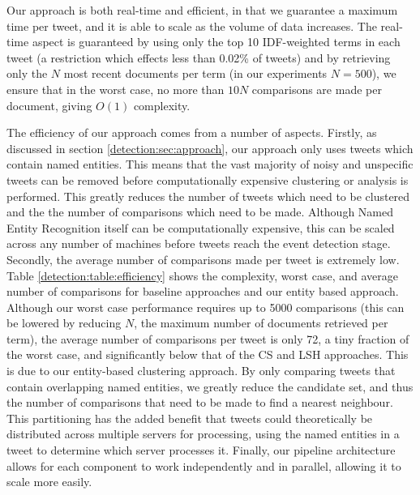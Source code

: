 Our approach is both real-time and efficient, in that we guarantee a maximum time per tweet, and it is able to scale as the volume of data increases.
The real-time aspect is guaranteed by using only the top 10 IDF-weighted terms in each tweet (a restriction which effects less than 0.02\% of tweets) and by retrieving only the \(N\) most recent documents per term (in our experiments \(N = 500\)), we ensure that in the worst case, no more than \(10N\) comparisons are made per document, giving \(O(1)\) complexity.

The efficiency of our approach comes from a number of aspects.
Firstly, as discussed in section \ref{detection:sec:approach}, our approach only uses tweets which contain named entities.
This means that the vast majority of noisy and unspecific tweets can be removed before computationally expensive clustering or analysis is performed.
This greatly reduces the number of tweets which need to be clustered and the the number of comparisons which need to be made.
Although Named Entity Recognition itself can be computationally expensive, this can be scaled across any number of machines before tweets reach the event detection stage.
Secondly, the average number of comparisons made per tweet is extremely low.
Table \ref{detection:table:efficiency} shows the complexity, worst case, and average number of comparisons for baseline approaches and our entity based approach.
Although our worst case performance requires up to 5000 comparisons (this can be lowered by reducing \(N\), the maximum number of documents retrieved per term), the average number of comparisons per tweet is only 72, a tiny fraction of the worst case, and significantly below that of the CS and LSH approaches.
This is due to our entity-based clustering approach.
By only comparing tweets that contain overlapping named entities, we greatly reduce the candidate set, and thus the number of comparisons that need to be made to find a nearest neighbour.
This partitioning has the added benefit that tweets could theoretically be distributed across multiple servers for processing, using the named entities in a tweet to determine which server processes it.
Finally, our pipeline architecture allows for each component to work independently and in parallel, allowing it to scale more easily.

